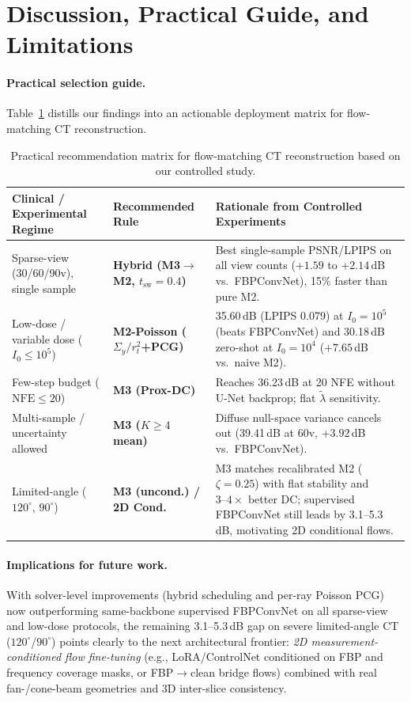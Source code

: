 \documentclass[11pt]{article}
\begin{document}
\section{Discussion, Practical Guide, and Limitations}
\paragraph{Practical selection guide.}
Table~\ref{tab:guide} distills our findings into an actionable deployment matrix for flow-matching CT reconstruction.

\begin{table}[t]
\centering
\caption{Practical recommendation matrix for flow-matching CT reconstruction based on our controlled study.}
\label{tab:guide}
\small
\begin{tabularx}{\linewidth}{l l X}
\toprule
Clinical / Experimental Regime & Recommended Rule & Rationale from Controlled Experiments \\
\midrule
Sparse-view (30/60/90v), single sample & \textbf{Hybrid (M3$\to$M2, $t_{\mathrm{sw}}{=}0.4$)} & Best single-sample PSNR/LPIPS on all view counts ($+1.59$ to $+2.14$\,dB vs.\ FBPConvNet), 15\% faster than pure M2. \\
Low-dose / variable dose ($I_0{\le}10^5$) & \textbf{M2-Poisson ($\Sigma_y/r_t^2$+PCG)} & 35.60\,dB (LPIPS 0.079) at $I_0{=}10^5$ (beats FBPConvNet) and 30.18\,dB zero-shot at $I_0{=}10^4$ ($+7.65$\,dB vs.\ naive M2). \\
Few-step budget ($\mathrm{NFE}\le 20$) & \textbf{M3 (Prox-DC)} & Reaches 36.23\,dB at 20 NFE without U-Net backprop; flat $\tilde\lambda$ sensitivity. \\
Multi-sample / uncertainty allowed & \textbf{M3 ($K\ge 4$ mean)} & Diffuse null-space variance cancels out (39.41\,dB at 60v, $+3.92$\,dB vs.\ FBPConvNet). \\
Limited-angle ($120^\circ$, $90^\circ$) & \textbf{M3 (uncond.) / 2D Cond.} & M3 matches recalibrated M2 ($\zeta{=}0.25$) with flat stability and $3\text{--}4\times$ better DC; supervised FBPConvNet still leads by 3.1--5.3\,dB, motivating 2D conditional flows. \\
\bottomrule
\end{tabularx}
\end{table}

\paragraph{Implications for future work.}
With solver-level improvements (hybrid scheduling and per-ray Poisson PCG) now outperforming same-backbone supervised FBPConvNet on all sparse-view and low-dose protocols, the remaining 3.1--5.3\,dB gap on severe limited-angle CT ($120^\circ$/$90^\circ$) points clearly to the next architectural frontier: \emph{2D measurement-conditioned flow fine-tuning} (e.g., LoRA/ControlNet conditioned on FBP and frequency coverage masks, or FBP$\to$clean bridge flows) combined with real fan-/cone-beam geometries and 3D inter-slice consistency.
\end{document}
